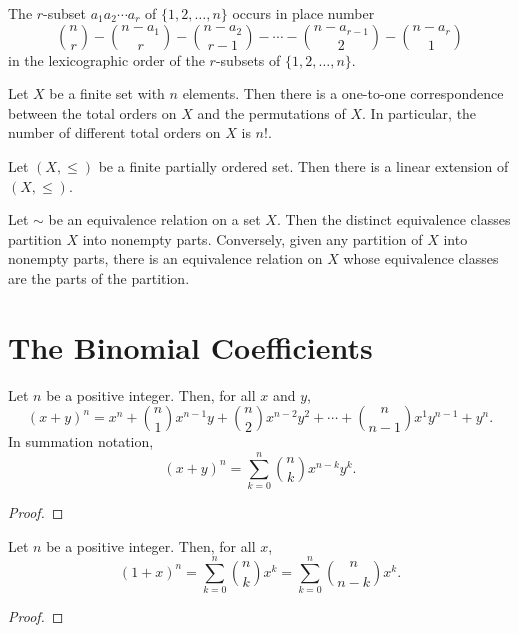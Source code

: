 \begin{theorem}
    \label{thm:4.4.2}
The $r$-subset $a_1a_2 \cdots a_r$ of $\{1, 2, \dots, n\}$ occurs in place number
\[
\binom{n}{r} - \binom{n - a_1}{r} - \binom{n - a_2}{r-1} - \cdots - \binom{n - a_{r-1}}{2} - \binom{n - a_r}{1}
\]
in the lexicographic order of the $r$-subsets of $\{1, 2, \dots, n\}$.
\end{theorem} 

\begin{theorem}
    \label{thm:4.5.1}
Let $X$ be a finite set with $n$ elements. Then there is a one-to-one correspondence between the total orders on $X$ and the permutations of $X$. In particular, the number of different total orders on $X$ is $n!$.
\end{theorem} 

\begin{theorem}
    \label{thm:4.5.2}
Let $(X, \leq)$ be a finite partially ordered set. Then there is a linear extension of $(X, \leq)$.
\end{theorem} 

\begin{theorem}
    \label{thm:4.5.3}
Let $\sim$ be an equivalence relation on a set $X$. Then the distinct equivalence classes partition $X$ into nonempty parts. Conversely, given any partition of $X$ into nonempty parts, there is an equivalence relation on $X$ whose equivalence classes are the parts of the partition.
\end{theorem} 

\chapter{The Binomial Coefficients}

\begin{theorem}
    \label{thm:5.2.1}
Let \( n \) be a positive integer. Then, for all \( x \) and \( y \),
\[
(x+y)^{n}=x^{n}+\binom{n}{1}x^{n-1}y+\binom{n}{2}x^{n-2}y^{2}+\cdots+\binom{n}{n-1}x^{1}y^{n-1}+y^{n}.
\]
In summation notation,
\[
(x+y)^n=\sum_{k=0}^n\binom{n}{k} x^{n-k} y^k.
\]
\end{theorem}
\begin{proof}
\end{proof}


\begin{theorem}
    \label{thm:5.2.2}
Let \( n \) be a positive integer. Then, for all \( x \),
\[
(1+x)^n = \sum_{k=0}^n \binom{n}{k} x^k = \sum_{k=0}^n \binom{n}{n-k} x^k.
\]
\end{theorem}
\begin{proof}
\end{proof}

